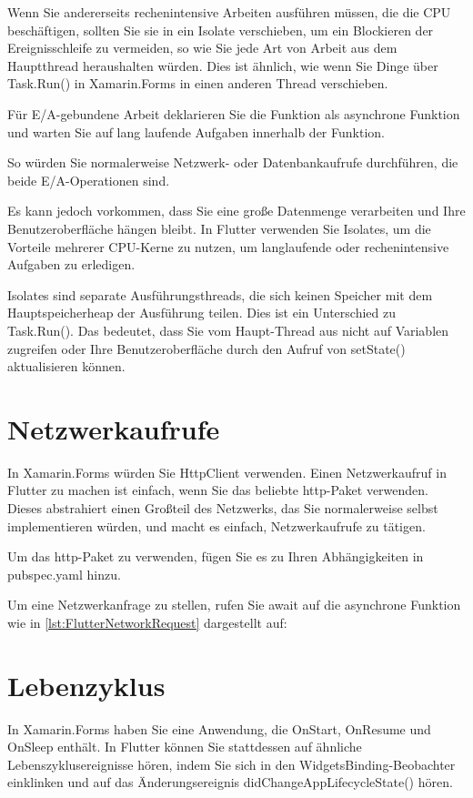 Wenn Sie andererseits rechenintensive Arbeiten ausführen müssen, die die CPU beschäftigen, sollten Sie sie in ein Isolate verschieben, um ein Blockieren der Ereignisschleife zu vermeiden, so wie Sie jede Art von Arbeit aus dem Hauptthread heraushalten würden. Dies ist ähnlich, wie wenn Sie Dinge über Task.Run() in Xamarin.Forms in einen anderen Thread verschieben.

Für E/A-gebundene Arbeit deklarieren Sie die Funktion als asynchrone Funktion und warten Sie auf lang laufende Aufgaben innerhalb der Funktion.

So würden Sie normalerweise Netzwerk- oder Datenbankaufrufe durchführen, die beide E/A-Operationen sind.

Es kann jedoch vorkommen, dass Sie eine große Datenmenge verarbeiten und Ihre Benutzeroberfläche hängen bleibt. In Flutter verwenden Sie Isolates, um die Vorteile mehrerer CPU-Kerne zu nutzen, um langlaufende oder rechenintensive Aufgaben zu erledigen.

Isolates sind separate Ausführungsthreads, die sich keinen Speicher mit dem Hauptspeicherheap der Ausführung teilen. Dies ist ein Unterschied zu Task.Run(). Das bedeutet, dass Sie vom Haupt-Thread aus nicht auf Variablen zugreifen oder Ihre Benutzeroberfläche durch den Aufruf von setState() aktualisieren können.
\section{Netzwerkaufrufe}
In Xamarin.Forms würden Sie HttpClient verwenden. Einen Netzwerkaufruf in Flutter zu machen ist einfach, wenn Sie das beliebte http-Paket verwenden. Dieses abstrahiert einen Großteil des Netzwerks, das Sie normalerweise selbst implementieren würden, und macht es einfach, Netzwerkaufrufe zu tätigen.

Um das http-Paket zu verwenden, fügen Sie es zu Ihren Abhängigkeiten in pubspec.yaml hinzu.

Um eine Netzwerkanfrage zu stellen, rufen Sie await auf die asynchrone Funktion wie in \ref{lst:FlutterNetworkRequest} dargestellt auf:


\begin{minipage}{\linewidth}

\end{minipage}

\section{Lebenzyklus}
In Xamarin.Forms haben Sie eine Anwendung, die OnStart, OnResume und OnSleep enthält. In Flutter können Sie stattdessen auf ähnliche Lebenszyklusereignisse hören, indem Sie sich in den WidgetsBinding-Beobachter einklinken und auf das Änderungsereignis didChangeAppLifecycleState() hören.

